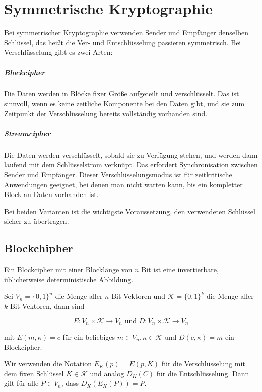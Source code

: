 \chapter{Symmetrische Kryptographie}

Bei symmetrischer Kryptographie verwenden Sender und Empfänger denselben Schlüssel, das heißt die Ver- und Entschlüsselung passieren symmetrisch.
Bei Verschlüsselung gibt es zwei Arten:

\paragraph{Blockcipher} Die Daten werden in Blöcke fixer Größe aufgeteilt und verschlüsselt. Das ist sinnvoll, wenn es keine zeitliche Komponente bei den Daten gibt, 
und sie zum Zeitpunkt der Verschlüsselung bereits vollständig vorhanden sind. 

\paragraph{Streamcipher} Die Daten werden verschlüsselt, sobald sie zu Verfügung stehen, und werden dann laufend mit dem Schlüsselstrom verknüpt. 
Das erfordert Synchronisation zwischen Sender und Empfänger. Dieser Verschlüsselungsmodus ist für zeitkritische Anwendungen geeignet, bei denen man nicht warten kann, bis 
ein kompletter Block an Daten vorhanden ist.

Bei beiden Varianten ist die wichtigste Voraussetzung, den verwendeten Schlüssel sicher zu übertragen.

\section{Blockchipher}

\begin{definition}[Blockcipher]
Ein Blockcipher mit einer Blocklänge von $n$ Bit ist eine invertierbare, üblicherweise deterministische Abbildung.

Sei $V_n = \{0, 1\}^n$ die Menge aller $n$ Bit Vektoren und $\mathcal{K} = \{0, 1\}^k$ die Menge aller $k$ Bit Vektoren, dann sind

$$E: V_n \times \mathcal{K} \to V_n \text{ und } D: V_n \times \mathcal{K} \to V_n$$

mit $E(m, \kappa) = c$ für ein beliebiges $m \in V_n, \kappa \in \mathcal{K}$ und $D(c, \kappa) = m$ ein Blockcipher.
\end{definition}

Wir verwenden die Notation $E_K(p) = E(p, K)$ für die Verschlüsselung mit dem fixen Schlüssel $K \in \mathcal{K}$ und analog $D_K(C)$ für die Entschlüsselung. Dann gilt 
für alle $P \in V_n$, dass $D_K(E_K(P)) = P$.

